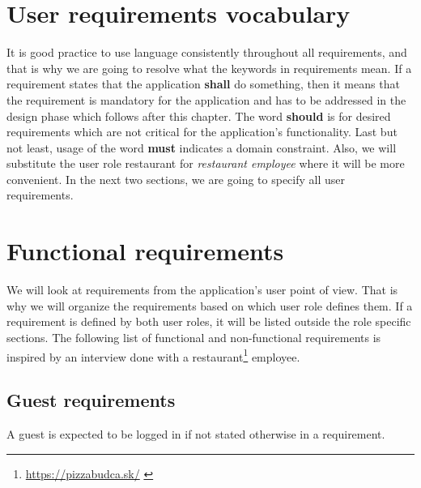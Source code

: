 \section{User requirements vocabulary}
It is good practice to use language consistently throughout all requirements, and that is why we are going to resolve what the keywords in requirements mean.
If a requirement states that the application \textbf{shall} do something, then it means that the requirement is mandatory for the application and has to be addressed in the design phase which follows after this chapter. 
The word \textbf{should} is for desired requirements which are not critical for the application's functionality.
Last but not least, usage of the word \textbf{must} indicates a domain constraint.
Also, we will substitute the user role restaurant for \emph{restaurant employee} where it will be more convenient.
In the next two sections, we are going to specify all user requirements. 

\section{Functional requirements}
We will look at requirements from the application's user point of view.
That is why we will organize the requirements based on which user role defines them.
If a requirement is defined by both user roles, it will be listed outside the role specific sections.
The following list of functional and non-functional requirements is inspired by an interview done with a restaurant\footnote{\url{https://pizzabudca.sk/}  \label{fnlabel}} employee.

\subsection{Guest requirements}
A guest is expected to be logged in if not stated otherwise in a requirement.

